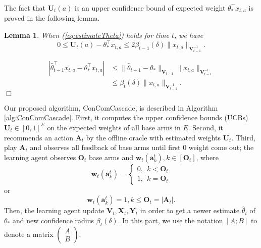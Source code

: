 \documentclass{article}
\newcommand{\bA}{\mathbf{A}}
\newcommand{\ba}{\mathbf{a}}
\newcommand{\bO}{\mathbf{O}}
\newcommand{\bU}{\mathbf{U}}
\newcommand{\bV}{\mathbf{V}}
\newcommand{\bw}{\mathbf{w}}
\newcommand{\bX}{\mathbf{X}}
\newcommand{\bY}{\mathbf{Y}}
\newcommand{\abs}[1]{\left| #1 \right|}
\newcommand{\norm}[1]{\| #1 \|}
\newtheorem{lemma}[theorem]{Lemma}%
\newenvironment{proof}{\noindent {\textbf{Proof. }}}{$\Box$ \medskip}
\begin{document}
The fact that $\bU_t(a)$ is an upper confidence bound of expected weight $\theta_*^{\top}x_{t,a}$ is proved in the following lemma.
\begin{lemma}
\label{lem:estimateU}
When (\ref{eq:estimateTheta}) holds for time $t$, we have
$$
0 \leq \bU_t(a) - \theta_{\ast}^{\top}x_{t,a} \leq 2\beta_{t-1}(\delta)\norm{x_{t,a}}_{\bV_{t-1}^{-1}}.
$$
\end{lemma}
\begin{proof}
\begin{align*}
\abs{\hat{\theta}_{t-1}^{\top}x_{t,a} - \theta_{\ast}^{\top}x_{t,a}} &\leq \norm{\hat{\theta}_{t-1} - \theta_{\ast}}_{\bV_{t-1}} \norm{x_{t,a}}_{\bV_{t-1}^{-1}} \\
&\leq \beta_{t}(\delta)\norm{x_{t,a}}_{\bV_{t-1}^{-1}}.
\end{align*}
\end{proof}

Our proposed algorithm, ConComCascade, is described in Algorithm \ref{alg:ConComCascade}. First, it computes the upper confidence bounds (UCBs) $\bU_t \in [0,1]^{E}$ on the expected weights of all base arms in $E$. Second, it recommends an action $\bA_t$ by the offline oracle with estimated weights $\bU_t$. Third, play $\bA_t$ and observes all feedback of base arms until first $0$ weight come out; the learning agent observes $\bO_t$ base arms and $\bw_t(\ba_k^t), k \in [\bO_t]$, where 
$$
\bw_t(\ba_{k}^t) = \begin{cases} 0, ~~k < \bO_t\\ 1, ~~k = \bO_t\end{cases}
$$ 
or
$$
\bw_t(\ba_k^t) = 1, k \leq \bO_t = \abs{\bA_t}.
$$
Then, the learning agent update $\bV_t, \bX_t, \bY_t$ in order to get a newer estimate $\hat{\theta}_t$ of $\theta_*$ and new confidence radius $\beta_t(\delta)$. In this part, we use the notation $[A; B]$ to denote a matrix $\begin{pmatrix} A\\ B\end{pmatrix}$.
\end{document}
